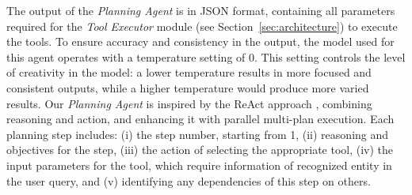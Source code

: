 \documentclass[runningheads]{llncs}
\begin{document}
The output of the \textit{Planning Agent} is in JSON format, containing all parameters required for the \textit{Tool Executor} module (see Section~\ref{sec:architecture}) to execute the tools. To ensure accuracy and consistency in the output, the model used for this agent operates with a temperature setting of 0. This setting controls the level of creativity in the model: a lower temperature results in more focused and consistent outputs, while a higher temperature would produce more varied results.
Our \textit{Planning Agent} is inspired by the ReAct approach \cite{Yao2022ReActSR}, combining reasoning and action, and enhancing it with parallel multi-plan execution. Each planning step includes: (i) the step number, starting from 1, (ii) reasoning and objectives for the step, (iii) the action of selecting the appropriate tool, (iv) the input parameters for the tool, which require information of recognized entity in the user query, and (v) identifying any dependencies of this step on others.

\end{document}
